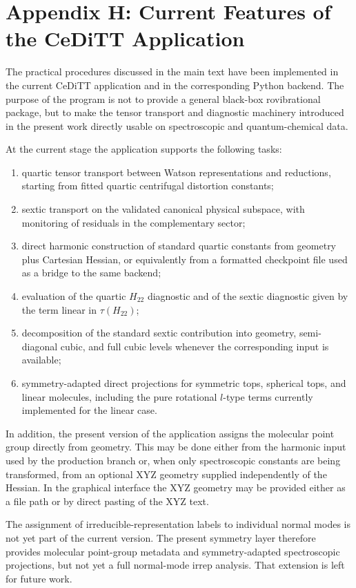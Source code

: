 \documentclass[aip,jcp,reprint,floatfix]{revtex4-2}
\begin{document}
\section{Appendix H: Current Features of the CeDiTT Application}

The practical procedures discussed in the main text have been implemented in
the current CeDiTT application and in the corresponding Python backend. The
purpose of the program is not to provide a general black-box rovibrational
package, but to make the tensor transport and diagnostic machinery introduced
in the present work directly usable on spectroscopic and quantum-chemical
data.

At the current stage the application supports the following tasks:
\begin{enumerate}
\item quartic tensor transport between Watson representations and reductions,
starting from fitted quartic centrifugal distortion constants;
\item sextic transport on the validated canonical physical subspace, with
monitoring of residuals in the complementary sector;
\item direct harmonic construction of standard quartic constants from geometry
plus Cartesian Hessian, or equivalently from a formatted checkpoint file used
as a bridge to the same backend;
\item evaluation of the quartic $H_{22}$ diagnostic and of the sextic
diagnostic given by the term linear in $\tau(H_{22})$;
\item decomposition of the standard sextic contribution into geometry,
semi-diagonal cubic, and full cubic levels whenever the corresponding input is
available;
\item symmetry-adapted direct projections for symmetric tops, spherical tops,
and linear molecules, including the pure rotational $l$-type terms currently
implemented for the linear case.
\end{enumerate}

In addition, the present version of the application assigns the molecular
point group directly from geometry. This may be done either from the harmonic
input used by the production branch or, when only spectroscopic constants are
being transformed, from an optional XYZ geometry supplied independently of the
Hessian. In the graphical interface the XYZ geometry may be provided either as
a file path or by direct pasting of the XYZ text.

The assignment of irreducible-representation labels to individual normal modes
is not yet part of the current version. The present symmetry layer therefore
provides molecular point-group metadata and symmetry-adapted spectroscopic
projections, but not yet a full normal-mode irrep analysis. That extension is
left for future work.



\end{document}
